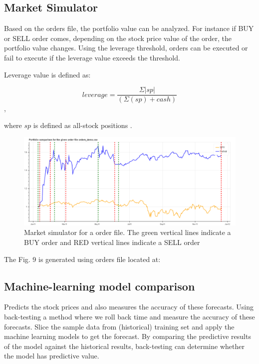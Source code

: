 \documentclass[12pt]{article}
\begin{document}
\begin{itemize}
\subsection{Market Simulator}
\label{sec:sim}
Based on the orders file, the portfolio value can be analyzed. For instance if BUY or SELL order comes, depending on the stock price value of the order, the portfolio value changes. Using the leverage threshold, orders can be executed or fail to execute if the leverage value exceeds the threshold.

Leverage value is defined as:

\[ leverage = \frac{\Sigma|sp|} {(\Sigma(sp) + cash) }\],

where $sp$ is defined as all-stock positions \cite{GeTechCourse}. 

\begin{figure}[!htbp]
\begin{center}
\includegraphics[height=0.5\textheight,width=\textwidth]{market.png}
\caption{Market simulator for a order file. The green vertical lines indicate a BUY order and RED vertical lines indicate a SELL order }
\end{center}
\label{fig:sim}
\end{figure}

The Fig. 9 is generated using orders file located at:
\\
\href{https://github.com/beegeesquare/QuantFy/blob/master/orders/orders_demo.csv}{\color{blue}{https://github.com/beegeesquare/QuantFy/blob/master/orders/orders\_demo.csv}}



\subsection{Machine-learning model comparison}
\label{sec:mlmodels}

Predicts the stock prices and also measures the accuracy of these forecasts. Using back-testing a method where we roll back time and measure the accuracy of these forecasts.  Slice the sample data from (historical) training set and apply the machine learning models to get the forecast.  By comparing the predictive results of the model against the historical results,  back-testing can determine whether the model has predictive value. 


\end{itemize}
\end{document}
